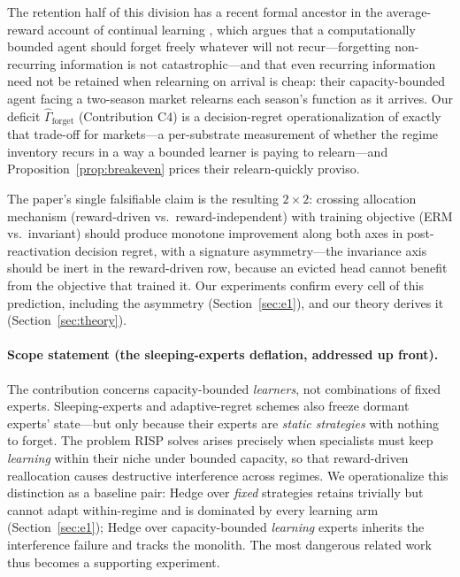 \documentclass{article}
\newcommand{\nm}{\textsc{RISP}}
\begin{document}
The retention half of this division has a recent formal ancestor in the
average-reward account of continual learning \citep{kumar2025continual},
which argues that a computationally bounded agent should forget freely
whatever will not recur---forgetting non-recurring information is not
catastrophic---and that even recurring information need not be retained
when relearning on arrival is cheap: their capacity-bounded agent facing
a two-season market relearns each season's function as it arrives. Our
deficit $\hat\Gamma_{\mathrm{forget}}$ (Contribution C4) is a
decision-regret operationalization of exactly that trade-off for
markets---a per-substrate measurement of whether the regime inventory
recurs in a way a bounded learner is paying to relearn---and
Proposition~\ref{prop:breakeven} prices their relearn-quickly proviso.

The paper's single falsifiable claim is the resulting $2{\times}2$:
crossing allocation mechanism (reward-driven vs.\ reward-independent) with
training objective (ERM vs.\ invariant) should produce monotone improvement
along both axes in post-reactivation decision regret, with a signature
asymmetry---the invariance axis should be inert in the reward-driven row,
because an evicted head cannot benefit from the objective that trained it.
Our experiments confirm every cell of this prediction, including the
asymmetry (Section~\ref{sec:e1}), and our theory derives it
(Section~\ref{sec:theory}).

\paragraph{Scope statement (the sleeping-experts deflation, addressed up
front).} The contribution concerns capacity-bounded \emph{learners}, not
combinations of fixed experts. Sleeping-experts and adaptive-regret schemes
\citep{freund1997sleeping, hazan2009adaptive, daniely2015strongly} also
freeze dormant experts' state---but only because their experts are
\emph{static strategies} with nothing to forget. The problem \nm{} solves
arises precisely when specialists must keep \emph{learning} within their
niche under bounded capacity, so that reward-driven reallocation causes
destructive interference across regimes. We operationalize this distinction
as a baseline pair: Hedge over \emph{fixed} strategies retains trivially but
cannot adapt within-regime and is dominated by every learning arm
(Section~\ref{sec:e1}); Hedge over capacity-bounded \emph{learning} experts
inherits the interference failure and tracks the monolith. The most dangerous
related work thus becomes a supporting experiment.
\end{document}
